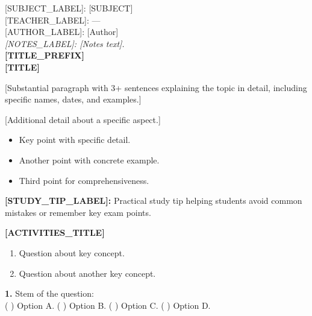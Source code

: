 \documentclass[11pt,a4paper]{article}
\newcommand{\secao}[1]{\vspace{8pt}{\bfseries\large #1}\par\vspace{2pt}}
\newcommand{\subsecao}[1]{\vspace{4pt}{\bfseries #1}\par\vspace{1pt}}
\newcommand{\dica}[1]{\vspace{2pt}\textbf{[STUDY_TIP_LABEL]:} #1\par\vspace{2pt}}
\newcommand{\ativtitulo}[1]{\vspace{6pt}{\bfseries #1}\par\vspace{2pt}}
\begin{document}
{\small [SUBJECT_LABEL]: [SUBJECT]}\\
{\small [TEACHER_LABEL]: ---}\\
{\small [AUTHOR_LABEL]: [Author]}\\[2pt]
{\small\itshape [NOTES_LABEL]: [Notes text].}\\[6pt]

{\bfseries\Large [TITLE_PREFIX]}\\
{\bfseries\Large [TITLE]}\\[6pt]


\secao{1. [SECTION TITLE]}

[Substantial paragraph with 3+ sentences explaining the topic in detail,
including specific names, dates, and examples.]

\subsecao{Sub-topic}
[Additional detail about a specific aspect.]

\begin{itemize}[nosep,leftmargin=14pt]
\item Key point with specific detail.
\item Another point with concrete example.
\item Third point for comprehensiveness.
\end{itemize}

\dica{Practical study tip helping students avoid common mistakes
or remember key exam points.}



{\bfseries\Large [ACTIVITIES_TITLE]}\\[6pt]

\ativtitulo{1 -- [COMPREHENSION_LABEL]}
\begin{enumerate}[nosep,leftmargin=14pt]
\item Question about key concept.
\item Question about another key concept.
\end{enumerate}

\ativtitulo{2 -- [MULTIPLE_CHOICE_LABEL]}

\textbf{1.} Stem of the question:\\[2pt]
\quad ( ) Option A. \quad ( ) Option B. \quad ( ) Option C. \quad ( ) Option D.\\[4pt]
\end{document}
